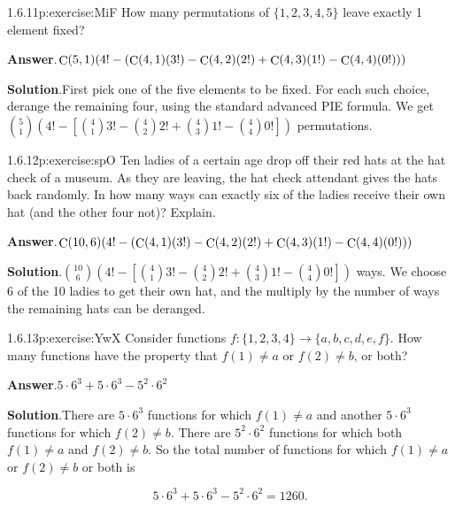 \documentclass[twoside,11pt,]{book}
\newcommand{\blocktitlefont}{\relax}
\numberwithin{equation}{chapter}
\begin{document}
\begin{divisionsolution}{1.6.11}{}{p:exercise:MiF}%
How many permutations of \(\{1,2,3,4,5\}\) leave exactly 1 element fixed?%
\par\smallskip%
\noindent\textbf{\blocktitlefont Answer}.\quad{}\(\mathop{\rm C}\nolimits\!\left(5,1\right)\!\left(4!-\left(\mathop{\rm C}\nolimits\!\left(4,1\right)\!\left(3!\right)-\mathop{\rm C}\nolimits\!\left(4,2\right)\!\left(2!\right)+\mathop{\rm C}\nolimits\!\left(4,3\right)\!\left(1!\right)-\mathop{\rm C}\nolimits\!\left(4,4\right)\!\left(0!\right)\right)\right)\)%
\par\smallskip%
\noindent\textbf{\blocktitlefont Solution}.\quad{}First pick one of the five elements to be fixed. For each such choice, derange the remaining four, using the standard advanced PIE formula. We get \({5 \choose 1}\left( 4! - \left[{4 \choose 1}3! - {4 \choose 2}2! + {4 \choose 3} 1! - {4 \choose 4} 0!\right] \right)\) permutations.%
\end{divisionsolution}%
\begin{divisionsolution}{1.6.12}{}{p:exercise:spO}%
Ten ladies of a certain age drop off their red hats at the hat check of a museum. As they are leaving, the hat check attendant gives the hats back randomly. In how many ways can exactly six of the ladies receive their own hat (and the other four not)? Explain.%
\par\smallskip%
\noindent\textbf{\blocktitlefont Answer}.\quad{}\(\mathop{\rm C}\nolimits\!\left(10,6\right)\!\left(4!-\left(\mathop{\rm C}\nolimits\!\left(4,1\right)\!\left(3!\right)-\mathop{\rm C}\nolimits\!\left(4,2\right)\!\left(2!\right)+\mathop{\rm C}\nolimits\!\left(4,3\right)\!\left(1!\right)-\mathop{\rm C}\nolimits\!\left(4,4\right)\!\left(0!\right)\right)\right)\)%
\par\smallskip%
\noindent\textbf{\blocktitlefont Solution}.\quad{}\({10 \choose 6}\left(4! - \left[{4 \choose 1} 3! - {4 \choose 2}2! + {4 \choose 3}1! - {4 \choose 4}0!\right]\right)\) ways. We choose 6 of the 10 ladies to get their own hat, and the multiply by the number of ways the remaining hats can be deranged.%
\end{divisionsolution}%
\begin{divisionsolution}{1.6.13}{}{p:exercise:YwX}%
Consider functions \(f: \{1,2,3,4\} \to \{a,b,c,d,e,f\}\text{.}\) How many functions have the property that \(f(1) \ne a\) or \(f(2) \ne b\text{,}\) or both?%
\par\smallskip%
\noindent\textbf{\blocktitlefont Answer}.\quad{}\(5\cdot 6^{3}+5\cdot 6^{3}-5^{2}\cdot 6^{2}\)%
\par\smallskip%
\noindent\textbf{\blocktitlefont Solution}.\quad{}There are \(5 \cdot 6^3\) functions for which \(f(1) \ne a\) and another \(5 \cdot 6^3\) functions for which \(f(2) \ne b\text{.}\) There are \(5^2 \cdot 6^2\) functions for which both \(f(1) \ne a\) and \(f(2) \ne b\text{.}\) So the total number of functions for which \(f(1) \ne a\) or \(f(2) \ne b\) or both is%
\par
%
\begin{equation*}
5 \cdot 6^3 + 5 \cdot 6^3 - 5^2 \cdot 6^2 = 1260
\text{.}
\end{equation*}
%
\end{divisionsolution}%
\end{document}
